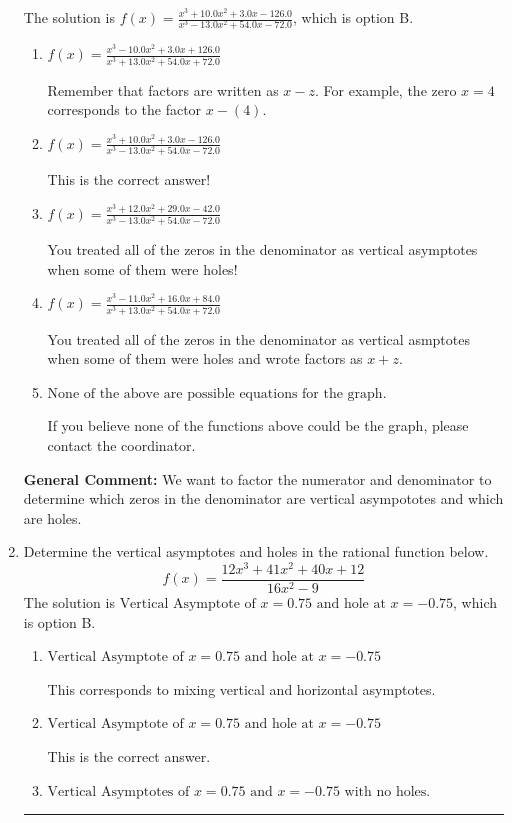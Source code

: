 \documentclass{extbook}[14pt]
\newcommand{\litem}[1]{\item #1

\rule{\textwidth}{0.4pt}}
\begin{document}
\begin{enumerate}
{The solution is \( f(x)=\frac{x^{3} +10.0 x^{2} +3.0 x -126.0}{x^{3} -13.0 x^{2} +54.0 x -72.0} \), which is option B.\begin{enumerate}[label=\Alph*.]
\item \( f(x)=\frac{x^{3} -10.0 x^{2} +3.0 x + 126.0}{x^{3} +13.0 x^{2} +54.0 x + 72.0} \)

Remember that factors are written as $x-z$. For example, the zero $x=4$ corresponds to the factor $x-(4)$.
\item \( f(x)=\frac{x^{3} +10.0 x^{2} +3.0 x -126.0}{x^{3} -13.0 x^{2} +54.0 x -72.0} \)

This is the correct answer!
\item \( f(x)=\frac{x^{3} +12.0 x^{2} +29.0 x -42.0}{x^{3} -13.0 x^{2} +54.0 x -72.0} \)

You treated all of the zeros in the denominator as vertical asymptotes when some of them were holes!
\item \( f(x)=\frac{x^{3} -11.0 x^{2} +16.0 x + 84.0}{x^{3} +13.0 x^{2} +54.0 x + 72.0} \)

You treated all of the zeros in the denominator as vertical asmptotes when some of them were holes and wrote factors as $x+z$.
\item \( \text{None of the above are possible equations for the graph.} \)

If you believe none of the functions above could be the graph, please contact the coordinator.
\end{enumerate}

\textbf{General Comment:} We want to factor the numerator and denominator to determine which zeros in the denominator are vertical asympototes and which are holes.
}
\litem{
Determine the vertical asymptotes and holes in the rational function below.
\[ f(x) = \frac{12x^{3} +41 x^{2} +40 x + 12}{16x^{2} -9} \]The solution is \( \text{Vertical Asymptote of } x = 0.75 \text{ and hole at } x = -0.75 \), which is option B.\begin{enumerate}[label=\Alph*.]
\item \( \text{Vertical Asymptote of } x = 0.75 \text{ and hole at } x = -0.75 \)

This corresponds to mixing vertical and horizontal asymptotes.
\item \( \text{Vertical Asymptote of } x = 0.75 \text{ and hole at } x = -0.75 \)

This is the correct answer.
\item \( \text{Vertical Asymptotes of } x = 0.75 \text{ and } x = -0.75 \text{ with no holes.} \)


\end{enumerate}}
\end{enumerate}
\end{document}
